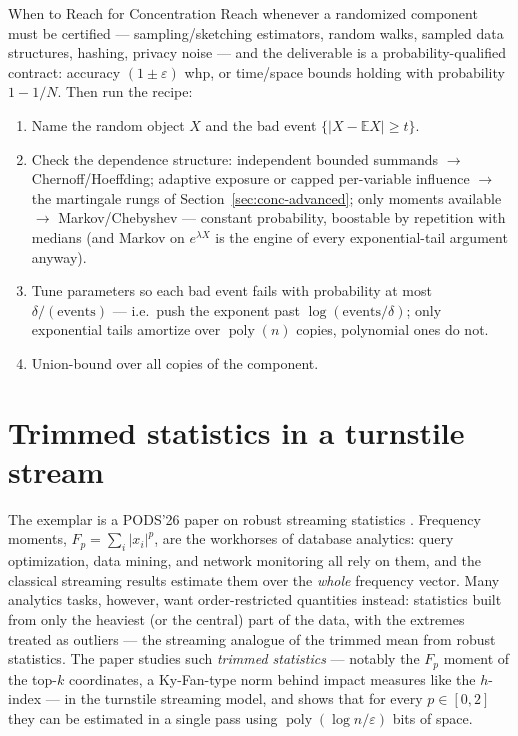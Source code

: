 \begin{reachbox}{When to Reach for Concentration}
Reach whenever a randomized component must be certified --- sampling/sketching estimators,
random walks, sampled data structures, hashing, privacy noise --- and the deliverable is a
probability-qualified contract: accuracy $(1\pm\varepsilon)$ whp, or time/space bounds
holding with probability $1-1/N$. Then run the recipe:
\begin{enumerate}
\item Name the random object $X$ and the bad event $\{|X - \mathbb{E}X| \ge t\}$.
\item Check the dependence structure: independent bounded summands $\to$
  Chernoff/Hoeffding; adaptive exposure or capped per-variable influence $\to$ the
  martingale rungs of Section~\ref{sec:conc-advanced}; only moments available $\to$
  Markov/Chebyshev --- constant probability, boostable by repetition with medians (and
  Markov on $e^{\lambda X}$ is the engine of every exponential-tail argument anyway).
\item Tune parameters so each bad event fails with probability at most
  $\delta/(\text{events})$ --- i.e.\ push the exponent past
  $\log(\text{events}/\delta)$; only exponential tails amortize over
  $\operatorname{poly}(n)$ copies, polynomial ones do not.
\item Union-bound over all copies of the component.
\end{enumerate}
\end{reachbox}

\section{Trimmed statistics in a turnstile stream}
\label{sec:conc-trimmed}

The exemplar is a PODS'26 paper on robust streaming statistics \cite{sigmod26-175}\pods.
Frequency moments, $F_p = \sum_i |x_i|^p$, are the workhorses of database analytics:
query optimization, data mining, and network monitoring all rely on them, and the
classical streaming results estimate them over the \emph{whole} frequency vector. Many
analytics tasks, however, want order-restricted quantities instead: statistics built from
only the heaviest (or the central) part of the data, with the extremes treated as
outliers --- the streaming analogue of the trimmed mean from robust statistics. The paper
studies such \emph{trimmed statistics} --- notably the $F_p$ moment of the top-$k$
coordinates, a Ky-Fan-type norm behind impact measures like the $h$-index --- in the
turnstile streaming model, and shows that for every $p \in [0,2]$ they can be estimated
in a single pass using $\operatorname{poly}(\log n/\varepsilon)$ bits of space.

